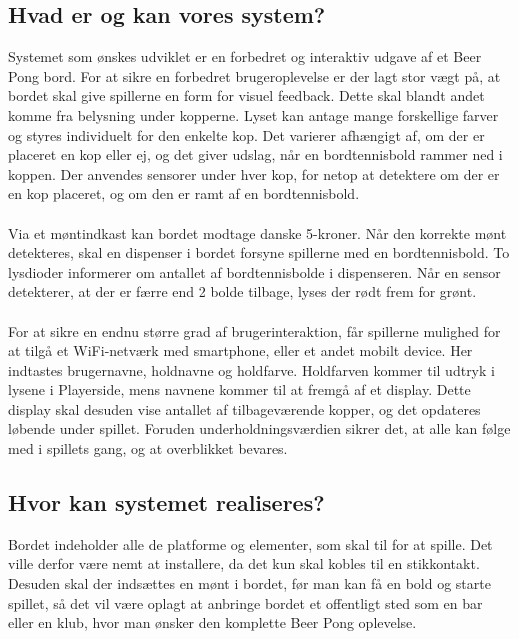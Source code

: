 \documentclass[Rapport/Rapport_main.tex]{subfiles}
\begin{document}
\subsection{Hvad er og kan vores system?}
Systemet som ønskes udviklet er en forbedret og interaktiv udgave af et Beer Pong bord. For at sikre en forbedret brugeroplevelse er der lagt stor vægt på, at bordet skal give spillerne en form for visuel feedback. Dette skal blandt andet komme fra belysning under kopperne. Lyset kan antage mange forskellige farver og styres individuelt for den enkelte kop. Det varierer afhængigt af, om der er placeret en kop eller ej, og det giver udslag, når en bordtennisbold rammer ned i koppen. Der anvendes sensorer under hver kop, for netop at detektere om der er en kop placeret, og om den er ramt af en bordtennisbold.\\\\Via et møntindkast kan bordet modtage danske 5-kroner. Når den korrekte mønt detekteres, skal en dispenser i bordet forsyne spillerne med en bordtennisbold. To lysdioder informerer om antallet af bordtennisbolde i dispenseren. Når en sensor detekterer, at der er færre end 2 bolde tilbage, lyses der rødt frem for grønt.\\\\For at sikre en endnu større grad af brugerinteraktion, får spillerne mulighed for at tilgå et WiFi-netværk med smartphone, eller et andet mobilt device. Her indtastes brugernavne, holdnavne og holdfarve. Holdfarven kommer til udtryk i lysene i Playerside, mens navnene kommer til at fremgå af et display. Dette display skal desuden vise antallet af tilbageværende kopper, og det opdateres løbende under spillet. Foruden underholdningsværdien sikrer det, at alle kan følge med i spillets gang, og at overblikket bevares.

\subsection{Hvor kan systemet realiseres?}
Bordet indeholder alle de platforme og elementer, som skal til for at spille. Det ville derfor være nemt at installere, da det kun skal kobles til en stikkontakt. Desuden skal der indsættes en mønt i bordet, før man kan få en bold og starte spillet, så det vil være oplagt at anbringe bordet et offentligt sted som en bar eller en klub, hvor man ønsker den komplette Beer Pong oplevelse.
\end{document}
